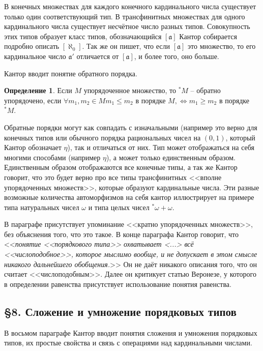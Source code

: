 \documentclass[a4paper,12pt]{extarticle}
\theoremstyle{definition}
\newtheorem{definition}{Определение}
\newcommand{\cit}[1]{<<\textit{#1}>>}
\begin{document}
В конечных множествах для каждого конечного кардинального числа существует только один соответствующий тип.
В трансфинитных множествах для одного кардинального числа существует несчётное число разных типов.
Совокупность этих типов образует класс типов, обозначающийся $[\mathfrak{a}]$
Кантор собирается подробно описать $[\aleph_0]$.
Так же он пишет, что если $[\mathfrak{a}]$ это множество, то его кардинальное число $\mathfrak{a'}$ отличается от $[\mathfrak{a}]$, и более того, оно больше.

Кантор вводит понятие обратного порядка.
\begin{definition}
    Если $M$ упорядоченное множество, то $^*M$ -- обратно упорядочено, если $\forall m_1, m_2 \in M m_1 \leqslant m_2$ в порядке $M, \iff m_1 \geqslant m_2$ в порядке $^*M$.
\end{definition}
Обратные порядки могут как совпадать с изначальными (например это верно для конечных типов или обычного порядка рациональных чисел на $(0, 1)$,
который Кантор обозначает $\eta$), так и отличаться от них.
Тип может отображаться на себя многими способами (например $\eta$), а может только единственным образом.
Единственным образом отображаются все конечные типы, а так же Кантор говорит, что это будет верно про все типы трансфинитных <<вполне упорядоченных множеств>>, которые образуют кардинальные числа.
Эти разные возможные количества автоморфизмов на себя кантор иллюстрирует на примере типа натуральных чисел $\omega$ и типа целых чисел $^*\omega + \omega$.

В параграфе присутствует упоминание <<кратно упорядоченных множеств>>, без объяснения того, что это такое.
В конце параграфа Кантор говорит, что \cit{понятие <<порядкового типа>> охватывает <...> всё <<числоподобное>>, которое мыслимо вообще, и не допускает в этом смысле никакого дальнейшего обобщения.}
Он не даёт никакого описания того, что он считает <<числоподобным>>.
Далее он критикует статью Веронезе, у которого в определении равенства присутствует использование понятия равенства.

\subsection{\S 8. Сложение и умножение порядковых типов}
В восьмом параграфе Кантор вводит понятия сложения и умножения порядковых типов, их простые свойства и связь с операциями над кардинальными числами.
\end{document}
